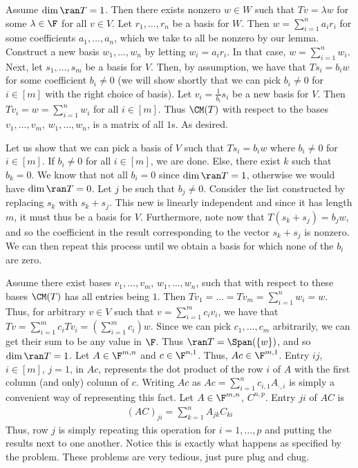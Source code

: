 \documentclass{book}
\begin{document}
\begin{enumerate}[label=\arabic*)]
      Assume $\dim\ran T = 1$. Then there exists nonzero $w \in W$ such that $Tv = \lambda w$ for some $\lambda \in \F$ for all $v \in V$. Let $r_1, \dots, r_n$ be a basis for $W$. Then $w =
      \sum_{i = 1}^{n}a_ir_i$ for some coefficients $a_1, \dots, a_n$, which we take to all be nonzero by our lemma. Construct a new basis $w_1, \dots, w_n$ by letting $w_i = a_ir_i$. In
      that case, $w = \sum_{i = 1}^{n}w_i$. Next, let $s_1, \dots, s_m$ be a basis for $V$. Then, by assumption, we have that $Ts_i = b_iw$ for some coefficient $b_i \neq 0$ (we will show
      shortly that we can pick $b_i \neq 0$ for $i \in [m]$ with the right choice of basis). Let $v_i = \frac{1}{b_i}s_i$ be a new basis for $V$. Then $Tv_i = w = \sum_{i = 1}^{n}w_i$ for
      all $i \in [m]$. Thus $\CM(T)$ with respect to the bases $v_1, \dots, v_m$, $w_1, \dots, w_n$, is a matrix of all $1$s. As desired.

      Let us show that we can pick a basis of $V$ such that $Ts_i = b_iw$ where $b_i \neq 0$ for $i \in [m]$. If $b_i \neq 0$ for all $i \in [m]$, we are done. Else, there exist $k$ such
      that $b_k = 0$. We know that not all $b_i = 0$ since $\dim\ran T = 1$, otherwise we would have $\dim\ran T = 0$. Let $j$ be such that $b_j \neq 0$. Consider the list constructed by
      replacing $s_k$ with $s_k + s_j$. This new is linearly independent and since it has length $m$, it must thus be a basis for $V$. Furthermore, note now that $T(s_k + s_j) = b_jw$, and
      so the coefficient in the result corresponding to the vector $s_k + s_j$ is nonzero. We can then repeat this process until we obtain a basis for which none of the $b_i$ are zero.

      Assume there exist bases $v_1, \dots, v_m$, $w_1, \dots, w_n$, such that with respect to these bases $\CM(T)$ has all entries being $1$. Then $Tv_1 = \dots = Tv_m = \sum_{i = 1}^{n}w_i
      = w$. Thus, for arbitrary $v \in V$ such that $v = \sum_{i = 1}^{m}c_iv_i$, we have that $Tv = \sum_{i = 1}^{m}c_iTv_i = (\sum_{i = 1}^{m}c_i)w$. Since we can pick $c_1, \dots, c_m$
      arbitrarily, we can get their sum to be any value in $\F$. Thus $\ran T = \Span(\{w\})$, and so $\dim\ran T = 1$.
    \ii
    \ii
    \ii
      Let $A \in \F^{m, n}$ and $c \in \F^{n, 1}$. Thus, $Ac \in \F^{m, 1}$. Entry $ij$, $i \in [m]$, $j = 1$, in $Ac$, represents the dot product of the row $i$ of $A$ with the first column (and
      only) column of $c$. Writing $Ac$ as $Ac = \sum_{i = 1}^{n}c_{i,1}A_{\cdot, i}$ is simply a convenient way of representing this fact.
    \ii
      Let $A \in \F^{m, n}$, $C^{n, p}$. Entry $ji$ of $AC$ is
      \begin{align*}
        (AC)_{ji} = \sum_{k = 1}^{n}A_{jk}C_{ki}
      \end{align*}
      Thus, row $j$ is simply repeating this operation for $i = 1, \dots, p$ and putting the results next to one another. Notice this is exactly what happens as specified by the problem.
    \ii
      These problems are very tedious, just pure plug and chug.
    \ii
    \ii
    \ii
    \ii
  \end{enumerate}
\end{document}
